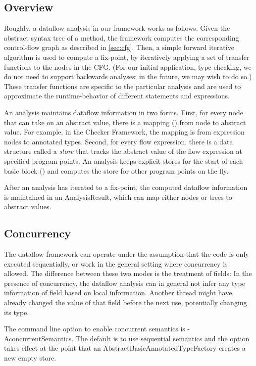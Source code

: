 \subsection{Overview}

Roughly, a dataflow analysis in our framework works as follows. Given the abstract syntax
tree of a method, the framework computes the corresponding control-flow graph as
described in \autoref{sec:cfg}. Then, a simple forward iterative algorithm is used to compute
a fix-point, by iteratively applying a set of transfer functions to the nodes in the
CFG\@.
(For our initial application, type-checking, we do not need to support
backwards analyses; in the future, we may wish to do so.)
 These transfer functions are specific to the particular analysis and are used
to approximate the runtime-behavior of different statements and expressions.

An analysis maintains dataflow information in two forms.  First, for every node that can take on an abstract value, there is a mapping () from node to abstract value.  For example, in the Checker Framework, the mapping is from expression nodes to annotated types.  Second, for every flow expression, there is a data structure called a \emph{store} that tracks the abstract value of the flow expression at specified program points.  An analysis keeps explicit stores for the start of each basic block () and computes the store for other program points on the fly.

After an analysis has iterated to a fix-point, the computed dataflow information is maintained in an AnalysisResult, which can map either nodes or trees to abstract values.


\subsection{Concurrency}

The dataflow framework can operate under the assumption that the code is only
executed sequentially, or work in the general setting where concurrency is allowed.
The difference between these two modes is the treatment of fields:  In the
presence of concurrency, the dataflow analysis can in general not infer any type information
of field based on local information.  Another thread might have already changed the value
of that field before the next use, potentially changing its type.

The command line option to enable concurrent semantics is -AconcurrentSemantics.  The default is to use sequential semantics and the option takes effect at the point that an AbstractBasicAnnotatedTypeFactory creates a new empty store.

